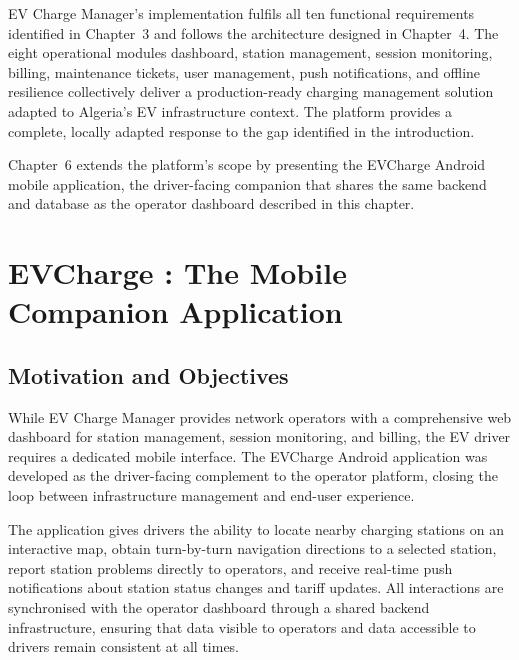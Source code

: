 \documentclass[12pt,a4paper]{report}
\begin{document}
EV Charge Manager's implementation fulfils all ten functional requirements identified in
Chapter~3 and follows the architecture designed in Chapter~4. The eight operational
modules dashboard, station management, session monitoring, billing, maintenance tickets,
user management, push notifications, and offline resilience collectively deliver a
production-ready charging management solution adapted to Algeria's EV infrastructure context. The platform provides a
complete, locally adapted response to the gap identified in the introduction.

Chapter~6 extends the platform's scope by presenting the EVCharge Android mobile application,
the driver-facing companion that shares the same backend and database as the operator dashboard
described in this chapter.


\chapter{EVCharge : The Mobile Companion Application}

\section{Motivation and Objectives}

While EV Charge Manager provides network operators with a comprehensive web dashboard for
station management, session monitoring, and billing, the EV driver requires a dedicated mobile
interface. The EVCharge Android application was developed as the driver-facing complement to
the operator platform, closing the loop between infrastructure management and end-user
experience.

The application gives drivers the ability to locate nearby charging stations on an interactive
map, obtain turn-by-turn navigation directions to a selected station, report station problems
directly to operators, and receive real-time push notifications about station status changes and
tariff updates. All interactions are synchronised with the operator dashboard through a shared
backend infrastructure, ensuring that data visible to operators and data accessible to drivers
remain consistent at all times.

\end{document}
